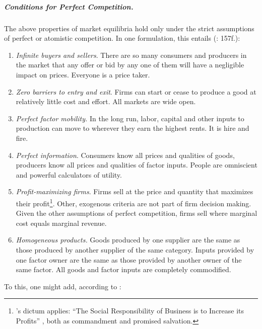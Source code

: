 \subparagraph[Perfect Competition]{Conditions for Perfect Competition.} \label{sec:perfectcompetition} The above properties of market equilibria hold only under the strict assumptions of perfect or atomistic competition. In one formulation, this entails (\citealt{McDowell2006}: 157f.): 
\begin{enumerate}
	\item \emph{Infinite buyers and sellers}.\label{it:infinitebuyerssellers} There are so many consumers and producers in the market that any offer or bid by any one of them will have a negligible impact on prices. Everyone is a price taker.
	\item \emph{Zero barriers to entry and exit}. \label{it:easyentryexit} 
		Firms can start or cease to produce a good at relatively little cost and effort. All markets are wide open. 
	\item \emph{Perfect factor mobility.} \label{it:perfectfactormobility} 
		In the long run, labor, capital and other inputs to production can move to wherever they earn the highest rents. It is hire and fire.
	\item \emph{Perfect information}. \label{it:perfectinformation} 
		Consumers know all prices and qualities of goods, producers know all prices and qualities of factor inputs. People are omniscient and powerful calculators of utility.
	\item \emph{Profit-maximizing firms}. \label{it:profit-maximizingfirms} 
		Firms sell at the price and quantity that maximizes their profit\footnote{
			\citeauthor{Friedman1970a}'s dictum applies: ``The Social Responsibility of Business is to Increase its Profits'' \citeyearpar{Friedman1970a}, both as commandment and promised salvation.}.
		Other, exogenous criteria are not part of firm decision making. Given the other assumptions of perfect competition, firms sell where marginal cost equals marginal revenue.
	\item \emph{Homogeneous products.}\label{it:homogeneousproducts}
		Goods produced by one supplier are the same as those produced by another supplier of the same category. Inputs provided by one factor owner are the same as those provided by another owner of the same factor. All goods and factor inputs are completely commodified. 
\end{enumerate} 
To this, one might add, according to \citeauthor{Wikipedia2012}:
